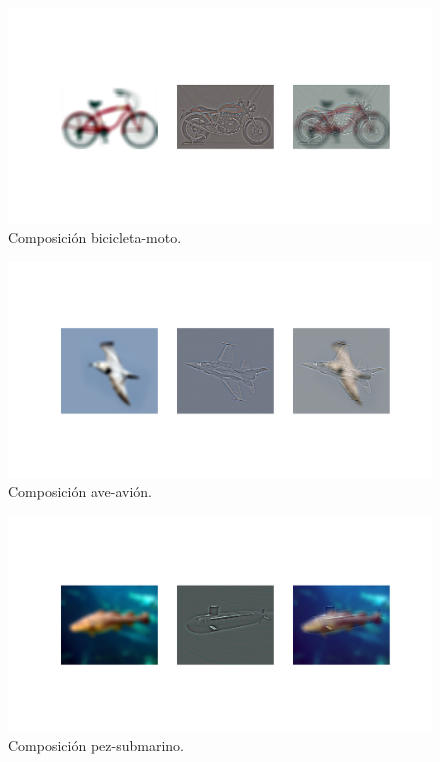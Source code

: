 \documentclass[11pt,a4paper]{article}
\begin{document}
\begin{figure}[H]
\centering
\includegraphics[scale=0.3]{img/c-hyb3.png}
\caption{Composición bicicleta-moto.}
\label{fig:c-hyb3}
\end{figure}

\begin{figure}[H]
\centering
\includegraphics[scale=0.3]{img/c-hyb4.png}
\caption{Composición ave-avión.}
\label{fig:c-hyb4}
\end{figure}

\begin{figure}[H]
\centering
\includegraphics[scale=0.3]{img/c-hyb5.png}
\caption{Composición pez-submarino.}
\label{fig:c-hyb5}
\end{figure}
\end{document}
